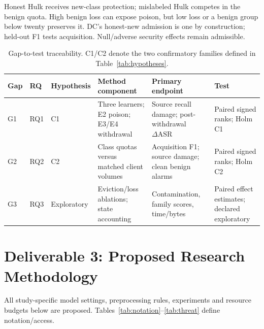 \documentclass[10pt,a4paper]{article}
\begin{document}
Honest Hulk receives new-class protection; mislabeled Hulk competes in the benign quota. High benign loss can expose poison, but low loss or a benign group below twenty preserves it. DC's honest-new admission is one by construction; held-out F1 tests acquisition. Null/adverse security effects remain admissible.

\begin{table}[htbp]
\centering\footnotesize
\caption{Gap-to-test traceability. C1/C2 denote the two confirmatory families defined in Table~\ref{tab:hypotheses}.}
\label{tab:trace}
\begin{tabularx}{\linewidth}{L{0.7cm}L{0.8cm}L{1.2cm}Y Y Y}
\toprule
Gap & RQ & Hypothesis & Method component & Primary endpoint & Test\\
\midrule
G1 & RQ1 & C1 & Three learners; E2 poison; E3/E4 withdrawal & Source recall damage; post-withdrawal $\Delta\mathrm{ASR}$ & Paired signed ranks; Holm C1\\
G2 & RQ2 & C2 & Class quotas versus matched client volumes & Acquisition F1; source damage; clean benign alarms & Paired signed ranks; Holm C2\\
G3 & RQ3 & Exploratory & Eviction/loss ablations; state accounting & Contamination, family scores, time/bytes & Paired effect estimates; declared exploratory\\
\bottomrule
\end{tabularx}
\end{table}

\section{Deliverable 3: Proposed Research Methodology}
All study-specific model settings, preprocessing rules, experiments and resource budgets below are proposed. Tables~\ref{tab:notation}--\ref{tab:threat} define notation/access.
\end{document}
